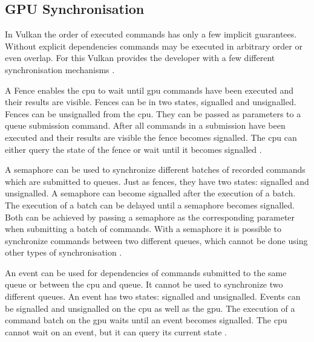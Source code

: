 

\subsection{GPU Synchronisation}
\label{section:synchronisation}
In Vulkan the order of executed commands has only a few implicit guarantees. Without explicit dependencies commands may be executed in arbitrary order or even overlap. For this Vulkan provides the developer with a few different synchronisation mechanisms \cite{khronos:vulkan:spec1.1}.

A Fence enables the \gls{cpu} to wait until \gls{gpu} commands have been executed and their results are visible. Fences can be in two states, signalled and unsignalled. Fences can be unsignalled from the \gls{cpu}. They can be passed as parameters to a queue submission command. After all commands in a submission have been executed and their results are visible the fence becomes signalled. The \gls{cpu} can either query the state of the fence or wait until it becomes signalled \cite{khronos:vulkan:spec1.1}.

A semaphore can be used to synchronize different batches of recorded commands which are submitted to queues. Just as fences, they have two states: signalled and unsignalled. A semaphore can become signalled after the execution of a batch. The execution of a batch can be delayed until a semaphore becomes signalled. Both can be achieved by passing a semaphore as the corresponding parameter when submitting a batch of commands. With a semaphore it is possible to synchronize commands between two different queues, which cannot be done using other types of synchronisation \cite{khronos:vulkan:spec1.1}.

An event can be used for dependencies of commands submitted to the same queue or between the \gls{cpu} and queue. It cannot be used to synchronize two different queues. An event has two states: signalled and unsignalled. Events can be signalled and unsignalled on the \gls{cpu} as well as the \gls{gpu}. The execution of a command batch on the \gls{gpu} waits until an event becomes signalled. The \gls{cpu} cannot wait on an event, but it can query its current state \cite{khronos:vulkan:spec1.1}.

